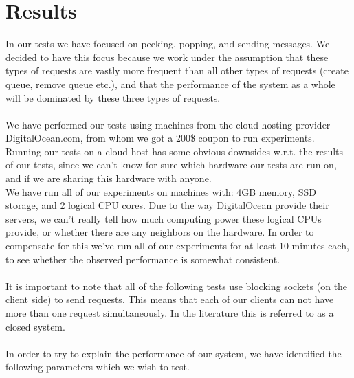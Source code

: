 \documentclass{article}
\begin{document}
    \section{Results}
        \label{sec:tests_and_results}
        In our tests we have focused on peeking, popping, and sending messages. We decided to have this focus because we work under the assumption that these types of requests are vastly more frequent than all other types of requests (create queue, remove queue etc.), and that the performance of the system as a whole will be dominated by these three types of requests.\\
        \\
        We have performed our tests using machines from the cloud hosting provider DigitalOcean.com, from whom we got a 200\$ coupon to run experiments. Running our tests on a cloud host has some obvious downsides w.r.t. the results of our tests, since we can't know for sure which hardware our tests are run on, and if we are sharing this hardware with anyone.\\
        We have run all of our experiments on machines with: 4GB memory, SSD storage, and 2 logical CPU cores. Due to the way DigitalOcean provide their servers, we can't really tell how much computing power these logical CPUs provide, or whether there are any neighbors on the hardware. In order to compensate for this we've run all of our experiments for at least 10 minutes each, to see whether the observed performance is somewhat consistent.\\
        \\
        It is important to note that all of the following tests use blocking sockets (on the client side) to send requests. This means that each of our clients can not have more than one request simultaneously. In the literature this is referred to as a closed system.\\
        \\
        In order to try to explain the performance of our system, we have identified the following parameters which we wish to test.
\end{document}

